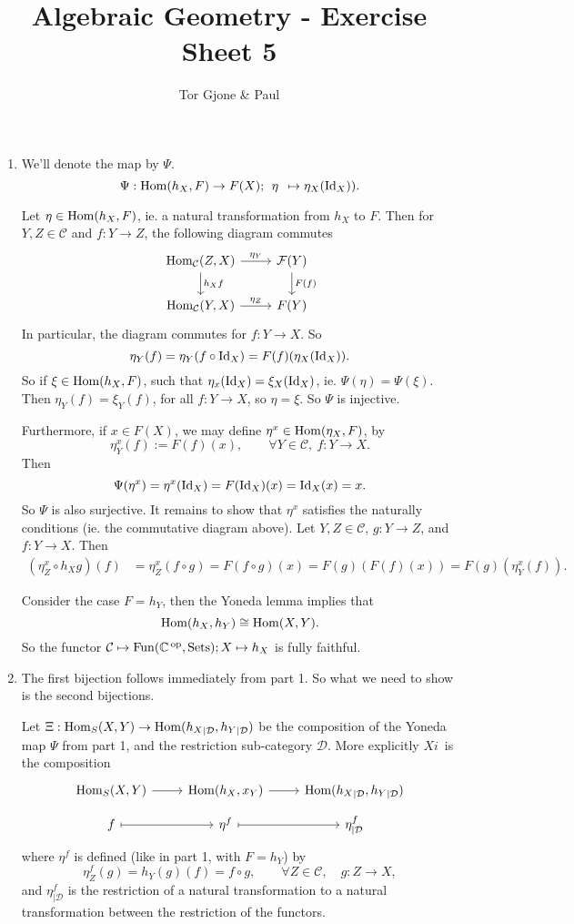 \documentclass[a5paper,11pt,english]{article}
\title{\textbf{Algebraic Geometry} - Exercise Sheet 5}
\author{Tor Gjone \& Paul}
\DeclareMathOperator{\Fun}{Fun}
\newcommand{\Cc}{\mathcal{C}}
\newcommand{\Dd}{\mathcal{D}}
\begin{document}
\mmaketitle


\begin{exercise}[2]
\begin{enumerate}
\item %
We'll denote the map by $\Psi$. 
\[ \Psi : \operatorname{Hom}(h_X, F) \to F(X); \:\:\eta\:\: \mapsto \eta_X(\operatorname{Id}_X)). \]

Let $\eta \in \operatorname{Hom}(h_X, F)$, ie. a natural transformation from $h_X$ to $F$. 
Then for $Y,Z \in \Cc$ and $f: Y \to Z$, the following diagram commutes
\[ \begin{tikzcd}
\Hom_\Cc(Z,X) \arrow[r,"\eta_Y"] \arrow[d, "h_X f"] & \F(Y) \arrow[d, "F(f)"] \\
\Hom_\Cc(Y,X) \arrow[r,"\eta_Z"] & F(Y)
\end{tikzcd} \]
In particular, the diagram commutes for $f : Y \to X$. So
\begin{equation}
\eta_Y(f) = \eta_Y(f\circ \operatorname{Id}_X) = F(f)(\eta_X(\operatorname{Id}_X)). 
\end{equation}
So if $\xi \in \operatorname{Hom}(h_X, F)$, such that $\eta_x(\operatorname{Id}_X) = \xi_X(\operatorname{Id}_X)$, ie.
$\Psi(\eta) = \Psi(\xi)$. Then $\eta_Y(f) = \xi_Y(f)$, for all $f: Y \to X$, so
$\eta = \xi$. So $\Psi$ is injective. 

Furthermore, if $x\in F(X)$, we may define $\eta^x \in \operatorname{Hom}(\eta_X,F)$, by 
\[ \eta^x_Y(f) := F(f)(x), \qquad \forall Y \in \Cc, \: f:Y \to X. \]
Then 
\[ \Psi(\eta^x) = \eta^x(\operatorname{Id}_X) = F(\operatorname{Id}_X)(x) = \operatorname{Id}_X(x) = x. \] 
So $\Psi$ is also surjective. It remains to show that $\eta^x$ satisfies the naturally
conditions (ie. the commutative diagram above). Let $Y,Z \in \Cc$, $g : Y \to
Z$, and $f: Y \to X$. Then
\begin{align*}
(\eta^x_Z \circ h_X g)(f) &= \eta^x_Z (f \circ g)  = F(f \circ g)(x)  =
F(g)(F(f)(x)) = F(g)(\eta^x_Y(f)).
\end{align*}


Consider the case $F = h_Y$, then the Yoneda lemma implies that  
\[ \operatorname{Hom}(h_X,h_Y) \cong \operatorname{Hom}(X,Y). \]
So the functor $\Cc \mapsto \Fun(\C\op, \Sets); X \mapsto h_X$ is fully
faithful.

\item %
The first bijection follows immediately from part 1. So what we need to show is
the second bijections.

Let $\Xi: \Hom_S(X,Y) \to \Hom({h_X}_{|\Dd},{h_Y}_{|\Dd})$ be the composition of
the Yoneda map $\Psi$ from part 1, and the restriction sub-category $\Dd$. More
explicitly $Xi$ is the composition
\[ \begin{tikzcd}[row sep=.6em]
\Hom_S(X,Y) \arrow[r]& \Hom(h_X,x_Y) \arrow[r] & \Hom({h_X}_{|\Dd},
{h_Y}_{|\Dd}) \\
f \arrow[r, mapsto]& \eta^f \arrow[r, mapsto]& \eta^f_{|\Dd}
\end{tikzcd} \]
where $\eta^f$ is defined (like in part 1, with $F = h_Y$) by 
\[ \eta^f_Z(g) = h_Y(g)(f) = f\circ g, \qquad \forall Z \in \Cc, \quad g:Z \to
X, \]
and $\eta^f_{|\Dd}$ is the restriction of a natural transformation to a natural
transformation between the restriction of the functors.


\end{enumerate}
\end{exercise}
\end{document}
